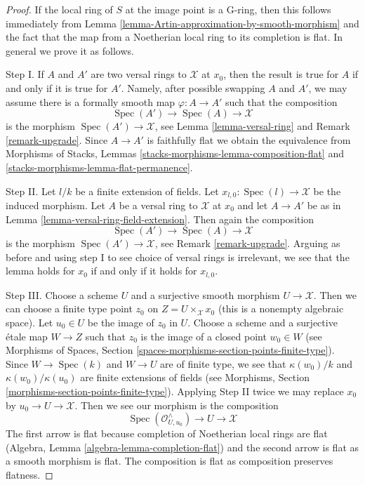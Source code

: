 \documentclass{stacks-project}
\theoremstyle{plain}
\theoremstyle{definition}
\theoremstyle{remark}
\numberwithin{equation}{subsection}
\def\Spec{\mathop{\mathrm{Spec}}}
\begin{document}
\begin{proof}
If the local ring of $S$ at the image point is a G-ring, then this
follows immediately from
Lemma \ref{lemma-Artin-approximation-by-smooth-morphism}
and the fact that the map from a Noetherian local ring to its
completion is flat. In general we prove it as follows.

\medskip\noindent
Step I. If $A$ and $A'$ are two versal rings to $\mathcal{X}$ at $x_0$,
then the result is true for $A$ if and only if it is true for $A'$.
Namely, after possible swapping $A$ and $A'$, we may assume there is
a formally smooth map $\varphi : A \to A'$ such that the composition
$$
\Spec(A') \to \Spec(A) \to \mathcal{X}
$$
is the morphism $\Spec(A') \to \mathcal{X}$, see
Lemma \ref{lemma-versal-ring} and
Remark \ref{remark-upgrade}.
Since $A \to A'$ is faithfully flat we obtain the equivalence from
Morphisms of Stacks, Lemmas \ref{stacks-morphisms-lemma-composition-flat} and
\ref{stacks-morphisms-lemma-flat-permanence}.

\medskip\noindent
Step II. Let $l/k$ be a finite extension of fields. Let
$x_{l, 0} : \Spec(l) \to \mathcal{X}$ be the induced morphism.
Let $A$ be a versal ring to $\mathcal{X}$ at $x_0$ and
let $A \to A'$ be as in Lemma \ref{lemma-versal-ring-field-extension}.
Then again the composition
$$
\Spec(A') \to \Spec(A) \to \mathcal{X}
$$
is the morphism $\Spec(A') \to \mathcal{X}$, see Remark \ref{remark-upgrade}.
Arguing as before and using step I to see choice of versal rings
is irrelevant, we see that the lemma holds for $x_0$ if and only
if it holds for $x_{l, 0}$.

\medskip\noindent
Step III. Choose a scheme $U$ and a surjective smooth morphism
$U \to \mathcal{X}$. Then we can choose a finite type point
$z_0$ on $Z = U \times_\mathcal{X} x_0$ (this is a nonempty
algebraic space). Let $u_0 \in U$ be the image of $z_0$ in $U$.
Choose a scheme and a surjective \'etale map $W \to Z$
such that $z_0$ is the image of a closed point $w_0 \in W$
(see Morphisms of Spaces, Section
\ref{spaces-morphisms-section-points-finite-type}).
Since $W \to \Spec(k)$ and $W \to U$ are of finite type,
we see that $\kappa(w_0)/k$ and $\kappa(w_0)/\kappa(u_0)$
are finite extensions of fields
(see Morphisms, Section \ref{morphisms-section-points-finite-type}).
Applying Step II twice we may replace $x_0$ by
$u_0 \to U \to \mathcal{X}$. Then we see our morphism is the composition
$$
\Spec(\mathcal{O}_{U, u_0}^\wedge) \to U \to \mathcal{X}
$$
The first arrow is flat because completion of Noetherian local rings
are flat (Algebra, Lemma \ref{algebra-lemma-completion-flat})
and the second arrow is flat as
a smooth morphism is flat. The composition is flat as composition
preserves flatness.
\end{proof}
\end{document}
